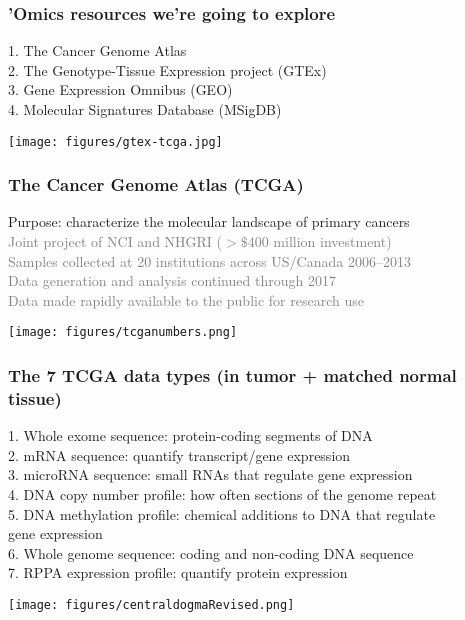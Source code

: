 \documentclass{beamer}
\newcommand{\si}[1]{\hspace{.5cm} \textcolor{gray} {#1}\\}
\begin{document}
\small{

\begin{frame}[t]
\frametitle{'Omics resources we're going to explore}
1. The Cancer Genome Atlas\\
\vspace{.1cm}
2. The Genotype-Tissue Expression project (GTEx)\\
\vspace{.1cm}
3. Gene Expression Omnibus (GEO)\\
\vspace{.1cm}
4. Molecular Signatures Database (MSigDB)\\
\vspace{.2cm}
\begin{center}
\texttt{[image: figures/gtex-tcga.jpg]}
\end{center}
\end{frame}

\begin{frame}[t]
\frametitle{The Cancer Genome Atlas (TCGA)}
Purpose: characterize the molecular landscape of primary cancers\\
\si{Joint project of NCI and NHGRI ($>\$400$ million investment)}
\si{Samples collected at 20 institutions across US/Canada 2006--2013}
\si{Data generation and analysis continued through 2017}
\si{Data made rapidly available to the public for research use}
\begin{center}
\texttt{[image: figures/tcganumbers.png]}
\end{center}
\end{frame}

\begin{frame}[t]
\frametitle{The 7 TCGA data types (in tumor + matched normal tissue)}
1. Whole exome sequence: protein-coding segments of DNA\\
\vspace{.1cm}
2. mRNA sequence: quantify transcript/gene expression\\
\vspace{.1cm}
3. microRNA sequence: small RNAs that regulate gene expression\\
\vspace{.1cm}
4. DNA copy number profile: how often sections of the genome repeat\\
\vspace{.1cm}
5. DNA methylation profile: chemical additions to DNA that regulate\\
\hspace{.5cm} gene expression\\
\vspace{.1cm}
6. Whole genome sequence: coding and non-coding DNA sequence\\
\vspace{.1cm}
7. RPPA expression profile: quantify protein expression\\
\vspace{.1cm}
\begin{center}
\texttt{[image: figures/centraldogmaRevised.png]}
\end{center}
\end{frame}

}
\end{document}
